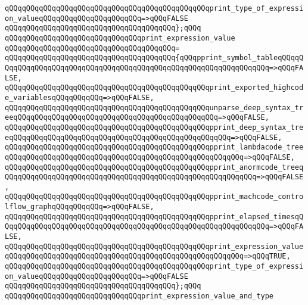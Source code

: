 \verb|qQQqqQQqqQQqqQQqqQQqqQQqqQQqqQQqqQQqqQQqqQQqqQQqprint_type_of_expression_valueqQQqqQQqqQQqqQQqqQQqqQQq=>qQQqFALSE|\newline
\verb|qQQqqQQqqQQqqQQqqQQqqQQqqQQqqQQqqQQqqQQq};qQQq|\newline
\newline
\verb|qQQqqQQqqQQqqQQqqQQqqQQqqQQqqQQqprint_expression_value|\newline
\verb|qQQqqQQqqQQqqQQqqQQqqQQqqQQqqQQqqQQqqQQq=|\newline
\verb|qQQqqQQqqQQqqQQqqQQqqQQqqQQqqQQqqQQqqQQq{qQQqpprint_symbol_tableqQQqqQQqqQQqqQQqqQQqqQQqqQQqqQQqqQQqqQQqqQQqqQQqqQQqqQQqqQQqqQQqqQQq=>qQQqFALSE,|\newline
\verb|qQQqqQQqqQQqqQQqqQQqqQQqqQQqqQQqqQQqqQQqqQQqqQQqprint_exported_highcode_variablesqQQqqQQqqQQq=>qQQqFALSE,|\newline
\verb|qQQqqQQqqQQqqQQqqQQqqQQqqQQqqQQqqQQqqQQqqQQqqQQqunparse_deep_syntax_treeqQQqqQQqqQQqqQQqqQQqqQQqqQQqqQQqqQQqqQQqqQQqqQQq=>qQQqFALSE,|\newline
\verb|qQQqqQQqqQQqqQQqqQQqqQQqqQQqqQQqqQQqqQQqqQQqqQQqpprint_deep_syntax_treeqQQqqQQqqQQqqQQqqQQqqQQqqQQqqQQqqQQqqQQqqQQqqQQqqQQq=>qQQqFALSE,|\newline
\verb|qQQqqQQqqQQqqQQqqQQqqQQqqQQqqQQqqQQqqQQqqQQqqQQqpprint_lambdacode_treeqQQqqQQqqQQqqQQqqQQqqQQqqQQqqQQqqQQqqQQqqQQqqQQqqQQqqQQq=>qQQqFALSE,|\newline
\verb|qQQqqQQqqQQqqQQqqQQqqQQqqQQqqQQqqQQqqQQqqQQqqQQqpprint_anormcode_treeqQQqqQQqqQQqqQQqqQQqqQQqqQQqqQQqqQQqqQQqqQQqqQQqqQQqqQQqqQQq=>qQQqFALSE,|\newline
\verb|qQQqqQQqqQQqqQQqqQQqqQQqqQQqqQQqqQQqqQQqqQQqqQQqpprint_machcode_controlflow_graphqQQqqQQqqQQq=>qQQqFALSE,|\newline
\verb|qQQqqQQqqQQqqQQqqQQqqQQqqQQqqQQqqQQqqQQqqQQqqQQqpprint_elapsed_timesqQQqqQQqqQQqqQQqqQQqqQQqqQQqqQQqqQQqqQQqqQQqqQQqqQQqqQQqqQQqqQQq=>qQQqFALSE,|\newline
\verb|qQQqqQQqqQQqqQQqqQQqqQQqqQQqqQQqqQQqqQQqqQQqqQQqprint_expression_valueqQQqqQQqqQQqqQQqqQQqqQQqqQQqqQQqqQQqqQQqqQQqqQQqqQQqqQQq=>qQQqTRUE,|\newline
\verb|qQQqqQQqqQQqqQQqqQQqqQQqqQQqqQQqqQQqqQQqqQQqqQQqprint_type_of_expression_valueqQQqqQQqqQQqqQQqqQQqqQQq=>qQQqFALSE|\newline
\verb|qQQqqQQqqQQqqQQqqQQqqQQqqQQqqQQqqQQqqQQq};qQQq|\newline
\newline
\verb|qQQqqQQqqQQqqQQqqQQqqQQqqQQqqQQqprint_expression_value_and_type|\newline
